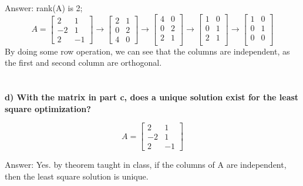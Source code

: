 \documentclass[paper=a4, fontsize=11pt]{scrartcl} %
\numberwithin{equation}{section} %
\numberwithin{figure}{section} %
\numberwithin{table}{section} %
\begin{document}
Answer: rank(A) is 2;
$$
A = 
\begin{bmatrix}
2 & 1 \\
-2 & 1 \\
2 & -1 
\end{bmatrix}
\rightarrow
\begin{bmatrix}
2 & 1 \\
0 & 2 \\
4 & 0 
\end{bmatrix}
\rightarrow
\begin{bmatrix}
4 & 0 \\
0 & 2 \\
2 & 1 \\
\end{bmatrix}
\rightarrow
\begin{bmatrix}
1 & 0 \\
0 & 1 \\
2 & 1 \\
\end{bmatrix}
\rightarrow
\begin{bmatrix}
1 & 0 \\
0 & 1 \\
0 & 0 \\
\end{bmatrix}
$$
By doing some row operation, we can see that the columns are independent, as the first and second column are orthogonal. \\\\\\

\textbf{d) With the matrix in part c, does a unique solution exist for the least square optimization? } 

$$
A = 
\begin{bmatrix}
2 & 1 \\
-2 & 1 \\
2 & -1 
\end{bmatrix}
$$


Answer: Yes. by theorem taught in class, if the columns of A are independent, then the least square solution is unique. 


\newpage
\end{document}

